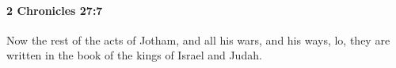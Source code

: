 
		\paragraph{2 Chronicles 27:7} %
			\label{2CHRONICLES-27-7}

			Now the rest of the acts of Jotham, and all his wars, and his ways, lo, they are written in the book of the kings of Israel and Judah.


